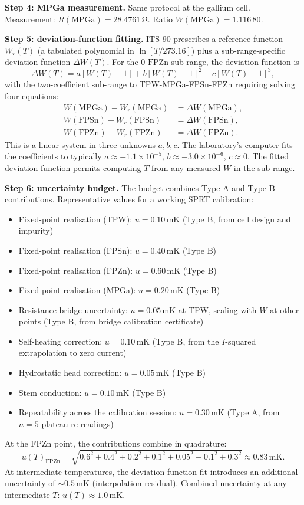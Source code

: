 \textbf{Step 4: MPGa measurement.} Same protocol at the gallium
cell. Measurement: $R(\text{MPGa}) = 28.4761 \,\si{\ohm}$. Ratio
$W(\text{MPGa}) = 1.116\,80$.

\textbf{Step 5: deviation-function fitting.} ITS-90 prescribes a
reference function $W_{r}(T)$ (a tabulated polynomial in
$\ln[T/273.16]$) plus a sub-range-specific deviation function
$\Delta W(T)$. For the $0$-$\text{FPZn}$ sub-range, the deviation
function is
\[
\Delta W(T) = a [W(T) - 1] + b [W(T) - 1]^{2} + c [W(T) - 1]^{3},
\]
with the two-coefficient sub-range to TPW-MPGa-FPSn-FPZn requiring
solving four equations:
\begin{align*}
W(\text{MPGa}) - W_{r}(\text{MPGa}) &= \Delta W(\text{MPGa}), \\
W(\text{FPSn}) - W_{r}(\text{FPSn}) &= \Delta W(\text{FPSn}), \\
W(\text{FPZn}) - W_{r}(\text{FPZn}) &= \Delta W(\text{FPZn}).
\end{align*}
This is a linear system in three unknowns $a, b, c$. The
laboratory's computer fits the coefficients to typically
$a \approx -1.1 \times 10^{-5}$, $b \approx -3.0 \times 10^{-6}$,
$c \approx 0$. The fitted deviation function permits computing
$T$ from any measured $W$ in the sub-range.

\textbf{Step 6: uncertainty budget.} The budget combines Type A
and Type B contributions. Representative values for a working
SPRT calibration:
\begin{itemize}
  \item Fixed-point realisation (TPW): $u = 0.10 \,\si{\milli
  \kelvin}$ (Type B, from cell design and impurity)
  \item Fixed-point realisation (FPSn): $u = 0.40 \,\si{\milli
  \kelvin}$ (Type B)
  \item Fixed-point realisation (FPZn): $u = 0.60 \,\si{\milli
  \kelvin}$ (Type B)
  \item Fixed-point realisation (MPGa): $u = 0.20 \,\si{\milli
  \kelvin}$ (Type B)
  \item Resistance bridge uncertainty: $u = 0.05 \,\si{\milli
  \kelvin}$ at TPW, scaling with $W$ at other points (Type B,
  from bridge calibration certificate)
  \item Self-heating correction: $u = 0.10 \,\si{\milli\kelvin}$
  (Type B, from the $I$-squared extrapolation to zero current)
  \item Hydrostatic head correction: $u = 0.05 \,\si{\milli
  \kelvin}$ (Type B)
  \item Stem conduction: $u = 0.10 \,\si{\milli\kelvin}$ (Type B)
  \item Repeatability across the calibration session:
  $u = 0.30 \,\si{\milli\kelvin}$ (Type A, from $n = 5$ plateau
  re-readings)
\end{itemize}
At the FPZn point, the contributions combine in quadrature:
\[
u(T)_{\text{FPZn}} = \sqrt{0.6^{2} + 0.4^{2} + 0.2^{2} + 0.1^{2}
+ 0.05^{2} + 0.1^{2} + 0.3^{2}} \approx 0.83 \,\si{\milli\kelvin}.
\]
At intermediate temperatures, the deviation-function fit
introduces an additional uncertainty of $\sim 0.5 \,\si{\milli
\kelvin}$ (interpolation residual). Combined uncertainty at any
intermediate $T$: $u(T) \approx 1.0 \,\si{\milli\kelvin}$.

